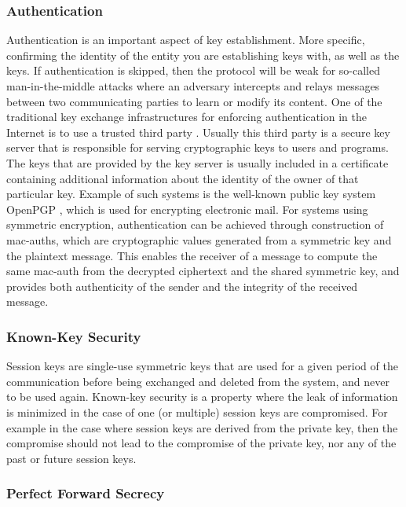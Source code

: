 \subsubsection{Authentication}

Authentication is an important aspect of key establishment. More specific, confirming the identity of the entity you are establishing keys with, as well as the keys. If authentication is skipped, then the protocol will be weak for so-called man-in-the-middle attacks where an adversary intercepts and relays messages between two communicating parties to learn or modify its content. One of the traditional key exchange infrastructures for enforcing authentication in the Internet is to use a trusted third party \cite{maurer1996modelling}. Usually this third party is a secure key server that is responsible for serving cryptographic keys to users and programs. The keys that are provided by the key server is usually included in a certificate containing additional information about the identity of the owner of that particular key. Example of such systems is the well-known public key system OpenPGP \cite{openpgp}, which is used for encrypting electronic mail. For systems using symmetric encryption, authentication can be achieved through construction of \gls{mac-auth}s, which are cryptographic values generated from a symmetric key and the plaintext message. This enables the receiver of a message to compute the same \gls{mac-auth} from the decrypted ciphertext and the shared symmetric key, and provides both authenticity of the sender and the integrity of the received message.

\subsubsection{Known-Key Security}

Session keys are single-use symmetric keys that are used for a given period of the communication before being exchanged and deleted from the system, and never to be used again. Known-key security is a property where the leak of information is minimized in the case of one (or multiple) session keys are compromised. For example in the case where session keys are derived from the private key, then the compromise should not lead to the compromise of the private key, nor any of the past or future session keys. 

\subsubsection{Perfect Forward Secrecy}

